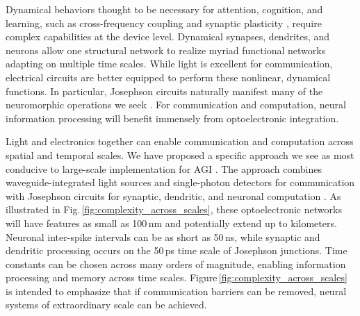 \documentclass{article}
\newenvironment{Figure}
  {\par\medskip\noindent\minipage{\linewidth}}
  {\endminipage\par\medskip}
\begin{document}
\begin{multicols}{2}
Dynamical behaviors thought to be necessary for attention, cognition, and learning, such as cross-frequency coupling \cite{bu2006} and synaptic plasticity \cite{mage2012,ab2008,fudr2005}, require complex capabilities at the device level. Dynamical synapses, dendrites, and neurons allow one structural network to realize myriad functional networks adapting on multiple time scales. While light is excellent for communication, electrical circuits are better equipped to perform these nonlinear, dynamical functions. In particular, Josephson circuits naturally manifest many of the neuromorphic operations we seek \cite{sh2018,sh2020}. For communication and computation, neural information processing will benefit immensely from optoelectronic integration.

Light and electronics together can enable communication and computation across spatial and temporal scales. We have proposed a specific approach we see as most conducive to large-scale implementation for AGI \cite{shbu2017,sh2018,sh2019,sh2020}. The approach combines waveguide-integrated light sources and single-photon detectors for communication \cite{shbu2017,buch2017} with Josephson circuits for synaptic, dendritic, and neuronal computation \cite{sh2018,sh2020}. As illustrated in Fig.\,\ref{fig:complexity_across_scales}, these optoelectronic networks will have features as small as 100\,nm and potentially extend up to kilometers. Neuronal inter-spike intervals can be as short as 50\,ns, while synaptic and dendritic processing occurs on the 50\,ps time scale of Josephson junctions. Time constants can be chosen across many orders of magnitude, enabling information processing and memory across time scales. Figure\,\ref{fig:complexity_across_scales} is intended to emphasize that if communication barriers can be removed, neural systems of extraordinary scale can be achieved.

\begin{Figure}
\end{Figure}


\end{multicols}
\end{document}

